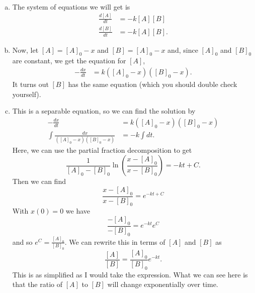 \documentclass[12pt]{article} %
\begin{document}
\begin{solution}~
\begin{enumerate}[(a)]
    \item The system of equations we will get is
    \begin{align*}
        \frac{d[A]}{dt}&=-k[A][B]\\
        \frac{d[B]}{dt}&=-k[A][B].
    \end{align*}
    \item Now, let $[A]=[A]_0-x$ and $[B]=[A]_0-x$ and, since $[A]_0$ and $[B]_0$ are constant, we get the equation for $[A]$,
    \begin{align*}
        -\frac{dx}{dt}&=k([A]_0-x)([B]_0-x).
    \end{align*}
    It turns out $[B]$ has the same equation (which you should double check yourself).
    \item This is a separable equation, so we can find the solution by
    \begin{align*}
        -\frac{dx}{dt}&=k([A]_0-x)([B]_0-x)\\
        \int \frac{dx}{([A]_0-x)([B]_0-x)}&=-k\int dt.
    \end{align*}
    Here, we can use the partial fraction decomposition to get
    \[
    \frac{1}{[A]_0-[B]_0}\ln\left( \frac{x-[A]_0}{x-[B]_0}\right)=-kt+C.
    \]
    Then we can find
    \[
    \frac{x-[A]_0}{x-[B]_0}=e^{-kt+C}
    \]
    With $x(0)=0$ we have
    \[
    \frac{-[A]_0}{-[B]_0}=e^{-kt}e^C
    \]
    and so $e^C=\frac{[A]_0}{[B]_0}$. We can rewrite this in terms of $[A]$ and $[B]$ as
    \[
    \frac{[A]}{[B]}=\frac{[A]_0}{[B]_0}e^{-kt}.
    \]
    This is as simplified as I would take the expression. What we can see here is that the ratio of $[A]$ to $[B]$ will change exponentially over time.
\end{enumerate}
\end{solution}
\end{document}
